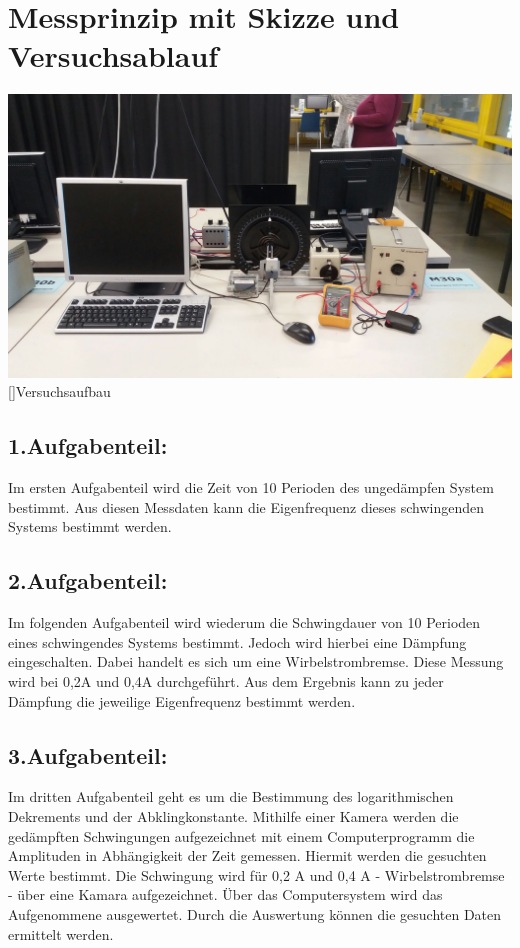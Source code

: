 \documentclass[12pt,a4paper,]{scrreprt}
\begin{document}
			\pagebreak
	
    
    
    
    
    
    
    
    
    
	\chapter{Messprinzip mit Skizze und Versuchsablauf}
    
      \begin{center}
    
    	\includegraphics[scale=0.25]{Unknown.jpg}
        []{Versuchsaufbau}
        \end{center}
		\section{1.Aufgabenteil:}
			Im ersten Aufgabenteil wird die Zeit von 10 Perioden des ungedämpfen System bestimmt. Aus diesen Messdaten kann die Eigenfrequenz dieses schwingenden Systems bestimmt werden.\\
		
        
        \section{2.Aufgabenteil:}
			Im folgenden Aufgabenteil wird wiederum die Schwingdauer von 10 Perioden eines schwingendes Systems bestimmt. Jedoch wird hierbei eine Dämpfung eingeschalten. Dabei handelt es sich um eine Wirbelstrombremse. 			Diese Messung wird bei 0,2A und 0,4A durchgeführt. Aus dem Ergebnis kann zu jeder Dämpfung die jeweilige Eigenfrequenz bestimmt werden. \\
		
        
        \section{3.Aufgabenteil:}
			Im dritten Aufgabenteil geht es um die Bestimmung des logarithmischen Dekrements und der Abklingkonstante. Mithilfe einer Kamera werden die gedämpften Schwingungen aufgezeichnet mit einem Computerprogramm die Amplituden in Abhängigkeit der Zeit gemessen. Hiermit werden die gesuchten Werte bestimmt. Die Schwingung wird für 0,2 A und 0,4 A - Wirbelstrombremse - über eine Kamara aufgezeichnet. Über das Computersystem wird das Aufgenommene ausgewertet. Durch die Auswertung können die gesuchten Daten ermittelt werden. \\
		
\end{document}
